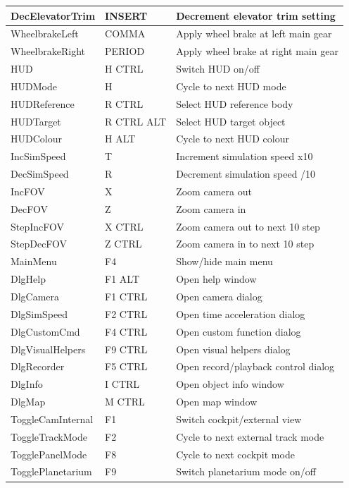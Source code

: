 \documentclass[Orbiter User Manual.tex]{subfiles}
\begin{document}
\begin{longtable}{ p{} p{} p{} }
	\hline
	DecElevatorTrim & INSERT & Decrement elevator trim setting\\
	\hline
	WheelbrakeLeft & COMMA & Apply wheel brake at left main gear\\
	\hline
	WheelbrakeRight & PERIOD & Apply wheel brake at right main gear\\
	\hline
	HUD & H CTRL & Switch HUD on/off\\
	\hline
	HUDMode & H & Cycle to next HUD mode\\
	\hline
	HUDReference & R CTRL & Select HUD reference body\\
	\hline
	HUDTarget & R CTRL ALT & Select HUD target object\\
	\hline
	HUDColour & H ALT & Cycle to next HUD colour\\
	\hline
	IncSimSpeed & T & Increment simulation speed x10\\
	\hline
	DecSimSpeed & R & Decrement simulation speed /10\\
	\hline
	IncFOV & X & Zoom camera out\\
	\hline
	DecFOV & Z & Zoom camera in\\
	\hline
	StepIncFOV & X CTRL & Zoom camera out to next 10\deg{} step\\
	\hline
	StepDecFOV & Z CTRL & Zoom camera in to next 10\deg{} step\\
	\hline
	MainMenu & F4 & Show/hide main menu\\
	\hline
	DlgHelp & F1 ALT & Open help window\\
	\hline
	DlgCamera & F1 CTRL & Open camera dialog\\
	\hline
	DlgSimSpeed & F2 CTRL & Open time acceleration dialog\\
	\hline
	DlgCustomCmd & F4 CTRL & Open custom function dialog\\
	\hline
	DlgVisualHelpers & F9 CTRL & Open visual helpers dialog\\
	\hline
	DlgRecorder & F5 CTRL & Open record/playback control dialog\\
	\hline
	DlgInfo & I CTRL & Open object info window\\
	\hline
	DlgMap & M CTRL & Open map window\\
	\hline
	ToggleCamInternal & F1 & Switch cockpit/external view\\
	\hline
	ToggleTrackMode & F2 & Cycle to next external track mode\\
	\hline
	TogglePanelMode & F8 & Cycle to next cockpit mode\\
	\hline
	TogglePlanetarium & F9 & Switch planetarium mode on/off\\

\end{longtable}
\end{document}
